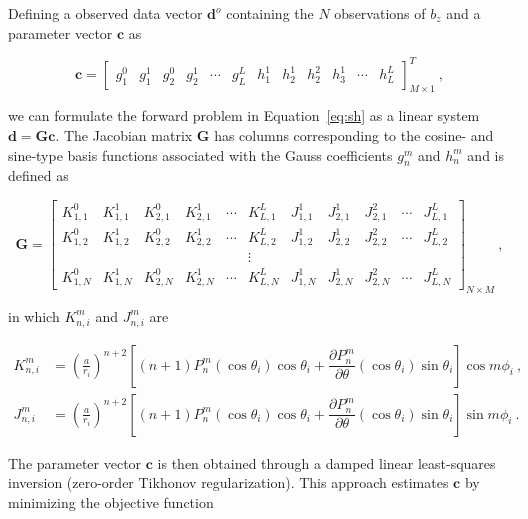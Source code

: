 Defining a observed data vector $\mathbf{d}^o$ containing the $N$ observations of $b_z$ and a parameter vector $\mathbf{c}$ as

\begin{equation}
    \mathbf{c} = 
    \begin{bmatrix}    
        g_1^0 & g_1^1 & g_2^0 & g_2^1 & \cdots & g_L^L 
        & h_1^1 & h_2^1 & h_2^2 & h_3^1 & \cdots & h_L^L
    \end{bmatrix}^T_{M \times 1} \ ,
\end{equation}

\noindent
we can formulate the forward problem in Equation~\ref{eq:sh} as a linear system $\mathbf{d} = \mathbf{G}\mathbf{c}$. The Jacobian matrix $\mathbf{G}$ has columns corresponding to the cosine- and sine-type basis functions associated with the Gauss coefficients $g_n^m$ and $h_n^m$ and is defined as

\begin{equation}
    \mathbf{G} =
    \begin{bmatrix}
        K_{1, 1}^0 & K_{1, 1}^1 & K_{2, 1}^0 & K_{2, 1}^1 & \cdots & K_{L, 1}^L & J_{1, 1}^1 & J_{2, 1}^1 & J_{2, 1}^2 & \cdots & J_{L, 1}^L
        \\
        K_{1, 2}^0 & K_{1, 2}^1 & K_{2, 2}^0 & K_{2, 2}^1 & \cdots & K_{L, 2}^L & J_{1, 2}^1 & J_{2, 2}^1 & J_{2, 2}^2 & \cdots & J_{L, 2}^L
        \\
        & & & & & \vdots 
        \\
        K_{1, N}^0 & K_{1, N}^1 & K_{2, N}^0 & K_{2, N}^1 & \cdots & K_{L, N}^L & J_{1, N}^1 & J_{2, N}^1 & J_{2, N}^2 & \cdots & J_{L, N}^L        
    \end{bmatrix}_{N \times M} \ ,
\label{eq:jacobian}
\end{equation}

\noindent
in which $K_{n,i}^m$ and $J_{n,i}^m$ are

\begin{align}
K_{n, i}^m &= \left( \frac{a}{r_i} \right)^{n + 2} \left[
    (n + 1) P_n^m(\cos\theta_i)\cos\theta_i + 
    \dfrac{\partial P_n^m}{\partial \theta}(\cos\theta_i)\sin\theta_i
\right] \cos m\phi_i \ ,
\\
J_{n, i}^m &= \left( \frac{a}{r_i} \right)^{n + 2} \left[
    (n + 1) P_n^m(\cos\theta_i)\cos\theta_i + 
    \dfrac{\partial P_n^m}{\partial \theta}(\cos\theta_i)\sin\theta_i
\right] \sin m\phi_i \ .
\end{align}

The parameter vector $\mathbf{c}$ is then obtained through a damped linear least-squares inversion (zero-order Tikhonov regularization). This approach estimates $\mathbf{c}$ by minimizing the objective function

